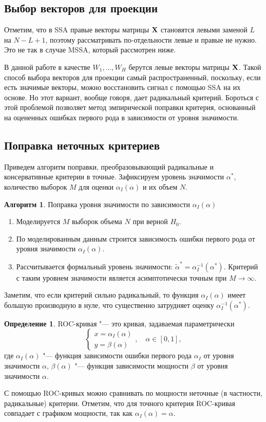 \documentclass[specialist,
substylefile = spbu_report.rtx,
subf,href,colorlinks=true, 12pt]{disser}
\theoremstyle{definition}
\newtheorem{definition}{Определение}
\newtheorem{algorithm}{Алгоритм}
\begin{document}
\subsection{Выбор векторов для проекции}\label{sect:vectors_choise}
Отметим, что в SSA правые векторы матрицы $\mathbf{X}$ становятся левыми заменой $L$ на $N-L+1$, поэтому рассматривать по-отдельности левые и правые не нужно. Это не так в случае MSSA, который рассмотрен ниже.

В данной работе в качестве $W_1, \ldots,W_H$ берутся левые векторы матрицы $\mathbf{X}$. Такой способ выбора векторов для проекции самый распространенный, поскольку, если есть значимые векторы, можно восстановить сигнал с помощью SSA на их основе. Но этот вариант, вообще говоря, дает радикальный критерий. Бороться с этой проблемой позволяет метод эмпирической поправки критерия, основанный на оцененных ошибках первого рода в зависимости
от уровня значимости.

\subsection{Поправка неточных критериев}\label{sect:correction}
Приведем алгоритм поправки, преобразовывающий радикальные и консервативные критерии в точные. Зафиксируем уровень значимости $\alpha^*$, количество выборок $M$ для оценки $\alpha_I(\alpha)$ и их объем $N$.
\begin{algorithm}{Поправка уровня значимости по зависимости $\alpha_I(\alpha)$}~\cite{Larin_2022}\label{alg:correction}
	\begin{enumerate}
		\item Моделируется $M$ выборок объема $N$ при верной $H_0$.
		\item По моделированным данным строится зависимость ошибки первого рода от уровня значимости $\alpha_I(\alpha)$.
		\item Рассчитывается формальный уровень значимости: $\widetilde{\alpha}^*=\alpha_I^{-1}(\alpha^*)$. Критерий с таким уровнем значимости является асимптотически точным при $M\to\infty$.
	\end{enumerate}
\end{algorithm}

Заметим, что если критерий сильно радикальный, то функция $\alpha_I(\alpha)$ имеет большую производную в нуле, что существенно затрудняет оценку $\alpha_I^{-1}(\alpha^*)$.

\begin{definition}
	ROC-кривая "--- это кривая, задаваемая параметрически
	\[
		\begin{cases}
			x=\alpha_I(\alpha) \\
			y=\beta(\alpha)
		\end{cases},\quad \alpha\in[0,1],
	\]
	где $\alpha_I(\alpha)$ "--- функция зависимости ошибки первого рода $\alpha_I$ от уровня значимости $\alpha$, $\beta(\alpha)$ "--- функция зависимости мощности $\beta$ от уровня значимости $\alpha$.
\end{definition}
С помощью ROC-кривых можно сравнивать по мощности неточные (в частности, радикальные) критерии. Отметим, что для точного критерия ROC-кривая совпадает с графиком мощности, так как $\alpha_I(\alpha)=\alpha$.
\end{document}
